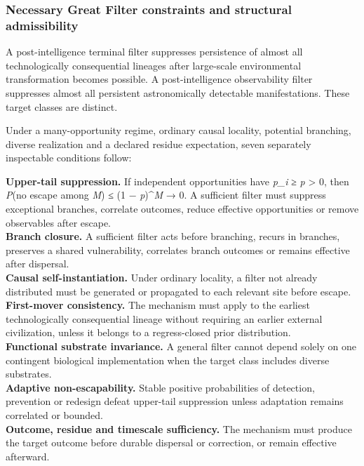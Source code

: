 \hypertarget{necessary-great-filter-constraints-and-structural-admissibility}{%
\subsubsection{Necessary Great Filter constraints and structural
admissibility}\label{necessary-great-filter-constraints-and-structural-admissibility}}

A post-intelligence terminal filter suppresses persistence of almost all
technologically consequential lineages after large-scale environmental
transformation becomes possible. A post-intelligence observability
filter suppresses almost all persistent astronomically detectable
manifestations. These target classes are distinct.

Under a many-opportunity regime, ordinary causal locality, potential
branching, diverse realization and a declared residue expectation, seven
separately inspectable conditions follow:

\textbf{Upper-tail suppression.} If independent opportunities have
\emph{p\_i} ≥ \emph{p} \textgreater{} 0, then \emph{P}(no escape among
\emph{M}) ≤ (1 − \emph{p})\^{}\emph{M} → 0. A sufficient filter must
suppress exceptional branches, correlate outcomes, reduce effective
opportunities or remove observables after escape.\\
\textbf{Branch closure.} A sufficient filter acts before branching,
recurs in branches, preserves a shared vulnerability, correlates branch
outcomes or remains effective after dispersal.\\
\textbf{Causal self-instantiation.} Under ordinary locality, a filter
not already distributed must be generated or propagated to each relevant
site before escape.\\
\textbf{First-mover consistency.} The mechanism must apply to the
earliest technologically consequential lineage without requiring an
earlier external civilization, unless it belongs to a regress-closed
prior distribution.\\
\textbf{Functional substrate invariance.} A general filter cannot depend
solely on one contingent biological implementation when the target class
includes diverse substrates.\\
\textbf{Adaptive non-escapability.} Stable positive probabilities of
detection, prevention or redesign defeat upper-tail suppression unless
adaptation remains correlated or bounded.\\
\textbf{Outcome, residue and timescale sufficiency.} The mechanism must
produce the target outcome before durable dispersal or correction, or
remain effective afterward.

